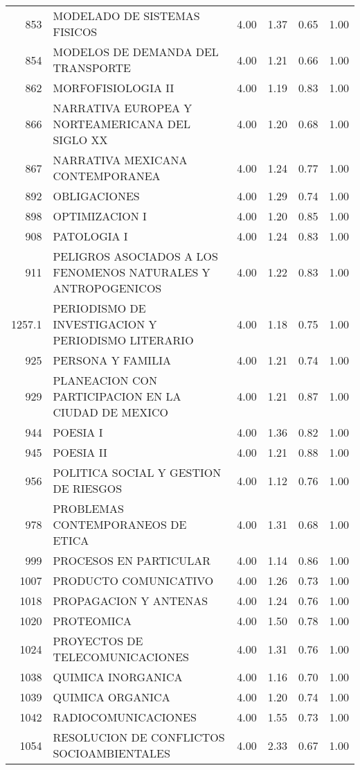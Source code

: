 \documentclass[12pt]{article}
\begin{document}
\begin{table}[ht]
\begin{tabular}{rlrrrr}
  853 & MODELADO DE SISTEMAS FISICOS & 4.00 & 1.37 & 0.65 & 1.00 \\ 
  854 & MODELOS DE DEMANDA DEL TRANSPORTE & 4.00 & 1.21 & 0.66 & 1.00 \\ 
  862 & MORFOFISIOLOGIA II & 4.00 & 1.19 & 0.83 & 1.00 \\ 
  866 & NARRATIVA EUROPEA Y NORTEAMERICANA DEL SIGLO XX & 4.00 & 1.20 & 0.68 & 1.00 \\ 
  867 & NARRATIVA MEXICANA CONTEMPORANEA & 4.00 & 1.24 & 0.77 & 1.00 \\ 
  892 & OBLIGACIONES & 4.00 & 1.29 & 0.74 & 1.00 \\ 
  898 & OPTIMIZACION I & 4.00 & 1.20 & 0.85 & 1.00 \\ 
  908 & PATOLOGIA I & 4.00 & 1.24 & 0.83 & 1.00 \\ 
  911 & PELIGROS ASOCIADOS A LOS FENOMENOS NATURALES Y ANTROPOGENICOS & 4.00 & 1.22 & 0.83 & 1.00 \\ 
  1257.1 & PERIODISMO DE INVESTIGACION Y PERIODISMO LITERARIO & 4.00 & 1.18 & 0.75 & 1.00 \\ 
  925 & PERSONA Y FAMILIA & 4.00 & 1.21 & 0.74 & 1.00 \\ 
  929 & PLANEACION CON PARTICIPACION EN LA CIUDAD DE MEXICO & 4.00 & 1.21 & 0.87 & 1.00 \\ 
  944 & POESIA I & 4.00 & 1.36 & 0.82 & 1.00 \\ 
  945 & POESIA II & 4.00 & 1.21 & 0.88 & 1.00 \\ 
  956 & POLITICA SOCIAL Y GESTION DE RIESGOS & 4.00 & 1.12 & 0.76 & 1.00 \\ 
  978 & PROBLEMAS CONTEMPORANEOS DE ETICA & 4.00 & 1.31 & 0.68 & 1.00 \\ 
  999 & PROCESOS EN PARTICULAR & 4.00 & 1.14 & 0.86 & 1.00 \\ 
  1007 & PRODUCTO COMUNICATIVO & 4.00 & 1.26 & 0.73 & 1.00 \\ 
  1018 & PROPAGACION Y ANTENAS & 4.00 & 1.24 & 0.76 & 1.00 \\ 
  1020 & PROTEOMICA & 4.00 & 1.50 & 0.78 & 1.00 \\ 
  1024 & PROYECTOS DE TELECOMUNICACIONES & 4.00 & 1.31 & 0.76 & 1.00 \\ 
  1038 & QUIMICA INORGANICA & 4.00 & 1.16 & 0.70 & 1.00 \\ 
  1039 & QUIMICA ORGANICA & 4.00 & 1.20 & 0.74 & 1.00 \\ 
  1042 & RADIOCOMUNICACIONES & 4.00 & 1.55 & 0.73 & 1.00 \\ 
  1054 & RESOLUCION DE CONFLICTOS SOCIOAMBIENTALES & 4.00 & 2.33 & 0.67 & 1.00 \\ 

\end{tabular}
\end{table}
\end{document}
